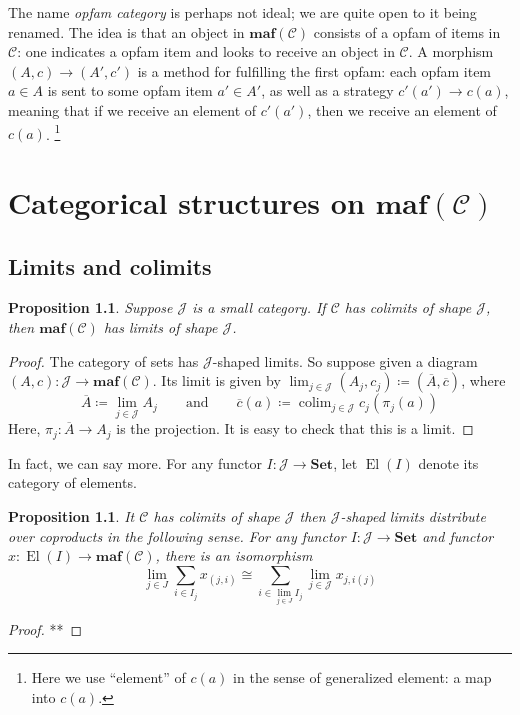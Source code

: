 \documentclass[11pt, one side, article]{memoir}
\theoremstyle{definition}
\theoremstyle{plain}
\newtheorem{proposition}[definitionx]{Proposition}
\DeclareMathOperator*{\colim}{colim}
\DeclareMathOperator{\el}{El}
\newcommand{\cat}[1]{\mathcal{#1}}%
\newcommand{\Cat}[1]{\mathbf{#1}}%
\newcommand{\ol}[1]{\overline{#1}}
\newcommand{\smset}{\Cat{Set}}
\newcommand{\0}{\Cat{0}}
\newcommand{\1}{\Cat{1}}
\newcommand{\opfam}{\Cat{maf}}
\newcommand{\qqand}{\qquad\text{and}\qquad}
\begin{document}
The name \emph{opfam category} is perhaps not ideal; we are quite open to it being renamed. The idea is that an object in $\opfam(\cat{C})$ consists of a opfam of items in $\cat{C}$: one indicates a opfam item and looks to receive an object in $\cat{C}$. A morphism $(A,c)\to (A',c')$ is a method for fulfilling the first opfam: each opfam item $a\in A$ is sent to some opfam item $a'\in A'$, as well as a strategy $c'(a')\to c(a)$, meaning that if we receive an element of $c'(a')$, then we receive an element of $c(a)$.%
\footnote{Here we use ``element'' of $c(a)$ in the sense of generalized element: a map into $c(a)$.}






\chapter{Categorical structures on $\opfam(\cat{C})$}

\section{Limits and colimits}

\begin{proposition}\label{prop.colimits_to_limits}
Suppose $\cat{J}$ is a small category. If $\cat{C}$ has colimits of shape $\cat{J}$, then $\opfam(\cat{C})$ has limits of shape $\cat{J}$. 
\end{proposition}
\begin{proof}
	The category of sets has $\cat{J}$-shaped limits. So suppose given a diagram $(A,c)\colon \cat{J}\to \opfam(\cat{C})$. Its limit is given by $\lim_{j\in \cat{J}}(A_j,c_j)\coloneqq(\ol{A},\ol{c})$, where
	\[
	\ol{A}\coloneqq\lim_{j\in \cat{J}}A_j
	\qqand
	\ol{c}(a)\coloneqq\colim_{j\in \cat{J}}c_j(\pi_j(a))
	\]
	Here, $\pi_j\colon \ol{A}\to A_j$ is the projection. It is easy to check that this is a limit.
\end{proof}

In fact, we can say more. For any functor $I\colon\cat{J}\to\smset$, let $\el(I)$ denote its category of elements.

\begin{proposition}
It $\cat{C}$ has colimits of shape $\cat{J}$ then $\cat{J}$-shaped limits distribute over coproducts in the following sense. For any functor $I\colon\cat{J}\to\smset$ and functor $x\colon\el(I)\to\opfam(\cat{C})$, there is an isomorphism
\[
\lim_{j\in J}\sum_{i\in I_j}x_{(j,i)}\cong\sum_{i\in\lim_{j\in J}I_j}\lim_{j\in \cat{J}}x_{j,i(j)}
\]
\end{proposition}
\begin{proof}
**
\end{proof}
\end{document}
